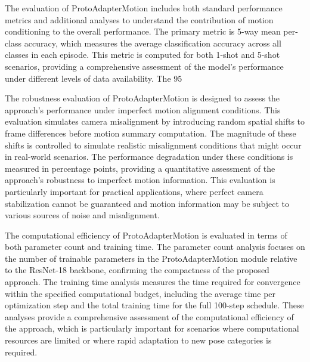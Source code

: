 \documentclass[11pt]{article}
\begin{document}
The evaluation of ProtoAdapterMotion includes both standard performance metrics and additional analyses to understand the contribution of motion conditioning to the overall performance. The primary metric is 5-way mean per-class accuracy, which measures the average classification accuracy across all classes in each episode. This metric is computed for both 1-shot and 5-shot scenarios, providing a comprehensive assessment of the model's performance under different levels of data availability. The 95%

The robustness evaluation of ProtoAdapterMotion is designed to assess the approach's performance under imperfect motion alignment conditions. This evaluation simulates camera misalignment by introducing random spatial shifts to frame differences before motion summary computation. The magnitude of these shifts is controlled to simulate realistic misalignment conditions that might occur in real-world scenarios. The performance degradation under these conditions is measured in percentage points, providing a quantitative assessment of the approach's robustness to imperfect motion information. This evaluation is particularly important for practical applications, where perfect camera stabilization cannot be guaranteed and motion information may be subject to various sources of noise and misalignment.

The computational efficiency of ProtoAdapterMotion is evaluated in terms of both parameter count and training time. The parameter count analysis focuses on the number of trainable parameters in the ProtoAdapterMotion module relative to the ResNet-18 backbone, confirming the compactness of the proposed approach. The training time analysis measures the time required for convergence within the specified computational budget, including the average time per optimization step and the total training time for the full 100-step schedule. These analyses provide a comprehensive assessment of the computational efficiency of the approach, which is particularly important for scenarios where computational resources are limited or where rapid adaptation to new pose categories is required.
\end{document}
